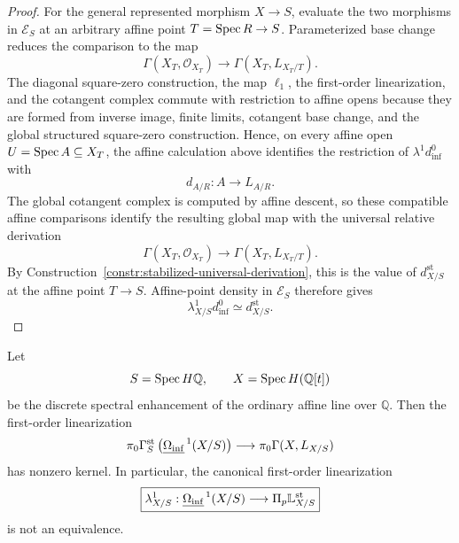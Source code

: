 \begin{proof}
For the general represented morphism \(X\to S\), evaluate the two morphisms in
\(\mathcal E_S\) at an arbitrary affine point \(T=\operatorname{Spec} R\to S\).
Parameterized base change reduces the comparison to the map
\[
    \Gamma(X_T,\mathcal O_{X_T})
    \longrightarrow
    \Gamma(X_T,L_{X_T/T}).
\]
The diagonal square-zero construction, the map \(\ell_1\), the first-order
linearization, and the cotangent complex commute with restriction to affine
opens because they are formed from inverse image, finite limits, cotangent
base change, and the global structured square-zero construction.  Hence, on
every affine open \(U=\operatorname{Spec} A\subseteq X_T\), the affine calculation above
identifies the restriction of \(\lambda^1d_{\inf}^0\) with
\[
    d_{A/R}:A\longrightarrow L_{A/R}.
\]
The global cotangent complex is computed by affine descent, so these compatible
affine comparisons identify the resulting global map with the universal
relative derivation
\[
    \Gamma(X_T,\mathcal O_{X_T})
    \longrightarrow
    \Gamma(X_T,L_{X_T/T}).
\]
By Construction~\ref{constr:stabilized-universal-derivation}, this is the value
of \(d^{\mathrm{st}}_{X/S}\) at the affine point \(T\to S\).  Affine-point
density in \(\mathcal E_S\) therefore gives
\[
    \lambda^1_{X/S}d_{\inf}^0
    \simeq
    d^{\mathrm{st}}_{X/S}.
\]
\end{proof}

\begin{proposition}
\label{prop:normalized-one-cochains-strictly-nonlinear}
Let
\[
    S=\operatorname{Spec} H\mathbb Q,
    \qquad
    X=\operatorname{Spec} H(\mathbb Q[t])
\]
be the discrete spectral enhancement of the ordinary affine line over \(\mathbb Q\).  Then the
first-order linearization
\[
    \pi_0\Gamma_S^{\mathrm{st}}
    \left(\underline{\Omega_{\mathrm{inf}}}^{\,1}(X/S)\right)
    \longrightarrow
    \pi_0\Gamma(X,L_{X/S})
\]
has nonzero kernel.  In particular, the canonical first-order linearization
\[
\boxed{
    \lambda^1_{X/S}:
    \underline{\Omega_{\mathrm{inf}}}^{\,1}(X/S)
    \longrightarrow
    \Pi_p\mathbb L^{\mathrm{st}}_{X/S}
}
\]
is not an equivalence.
\end{proposition}

